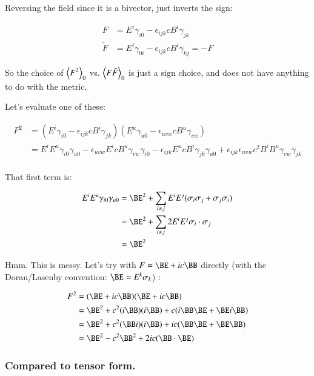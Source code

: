 Reversing the field since it is a bivector, just inverts the sign:

\begin{align*}
F &= E^i \gamma_{i 0} - \epsilon_{i j k} c B^i \gamma_{j k} \\
\tilde{F} &= E^i \gamma_{0 i} - \epsilon_{i j k} c B^i \gamma_{k j} = -F
\end{align*}

So the choice of ${\left\langle{{F^2}}\right\rangle}_{0}$ vs. ${\left\langle{{F \tilde{F}}}\right\rangle}_{0}$ is just a sign choice, and does not have anything to do with the metric.

Let's evaluate one of these:

\begin{align*}
F^2
&=
(E^i \gamma_{i 0} - \epsilon_{i j k} c B^i \gamma_{j k}) (E^u \gamma_{u 0} - \epsilon_{u v w} c B^u \gamma_{v w})  \\
&=
E^i E^u \gamma_{i 0} \gamma_{u 0}
- \epsilon_{u v w} E^i c B^u \gamma_{v w} \gamma_{i 0}
- \epsilon_{i j k} E^u c B^i \gamma_{j k} \gamma_{u 0}
+ \epsilon_{i j k} \epsilon_{u v w} c^2 B^i B^u \gamma_{v w} \gamma_{j k}
\\
\end{align*}

That first term is:

\begin{align*}
E^i E^u \gamma_{i 0} \gamma_{u 0}
&= \BE^2 + \sum_{i \ne j} E^i E^j ( \sigma_i \sigma_j + \sigma_j \sigma_i ) \\
&= \BE^2 + \sum_{i \ne j} 2 E^i E^j \sigma_i \cdot \sigma_j \\
&= \BE^2
\end{align*}

Hmm.  This is messy.  Let's try with $F = \BE + i c \BB$ directly (with the Doran/Lasenby convention: $\BE = E^k \sigma_k$) :

\begin{align*}
F^2
&= (\BE + i c \BB) (\BE + i c \BB) \\
&= \BE^2 + c^2 (i \BB) (i \BB) + c (i \BB \BE + \BE i \BB) \\
&= \BE^2 + c^2 (\BB i) (i \BB) + i c (\BB \BE + \BE \BB) \\
&= \BE^2 - c^2 \BB^2 + 2 i c (\BB \cdot \BE) \\
\end{align*}

\subsubsection{Compared to tensor form. }

